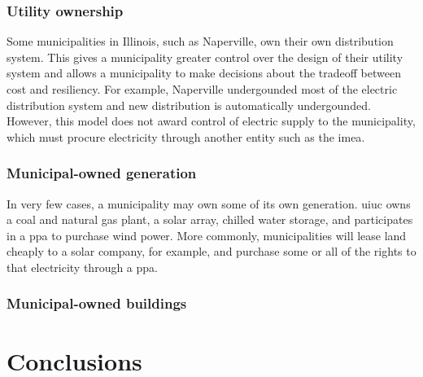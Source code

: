 \subsection{Utility ownership}
Some municipalities in Illinois, such as Naperville, own their own distribution
system. This gives a municipality greater control over the design of their
utility system and allows a municipality to make decisions about the tradeoff
between cost and resiliency. For example, Naperville undergounded most of the
electric distribution system and new distribution is automatically undergounded.
However, this model does not award control of electric supply to the
municipality, which must procure electricity through another entity such as the
\acf{imea}.

\subsection{Municipal-owned generation}
In very few cases, a municipality may own some of its own generation. \ac{uiuc}
owns a coal and natural gas plant, a solar array, chilled water storage, and
participates in a \ac{ppa} to purchase wind power. More commonly, municipalities
will lease land cheaply to a solar company, for example, and purchase some or all
of the rights to that electricity through a \ac{ppa}. 

\subsection{Municipal-owned buildings}

\fi

\chapter{Conclusions}

